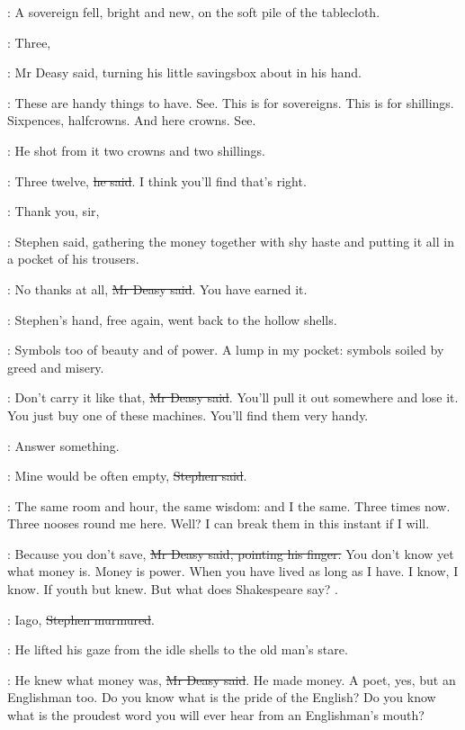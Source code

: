 :
A sovereign fell, bright and new, on the soft pile of the tablecloth.

\deasy:
Three,

:
Mr Deasy said, turning his little savingsbox about in his hand.

\deasy:
These are handy things to have.
See.
This is for sovereigns.
This is for shillings.
Sixpences, halfcrowns.
And here crowns.
See.

:
He shot from it two crowns and two shillings.

\deasy:
Three twelve, \sout{he said}. I think you'll find that's right.

\Stephen:
Thank you, sir,

:
Stephen said, gathering the money together with shy haste
and putting it all in a pocket of his trousers.

\deasy:
No thanks at all, \sout{Mr Deasy said}. You have earned it.

:
Stephen's hand, free again, went back to the hollow shells.

\StephenInt:
Symbols too of beauty and of power.
A lump in my pocket: symbols soiled by greed and misery.

\deasy:
Don't carry it like that,
\sout{Mr Deasy said}.
You'll pull it out somewhere and lose it.
You just buy one of these machines.
You'll find them very handy.

\StephenInt:
Answer something.

\Stephen:
Mine would be often empty,
\sout{Stephen said}.

\StephenInt:
The same room and hour, the same wisdom:
and I the same.
Three times now.
Three nooses round me here.
Well?
I can break them in this instant if I will.

\deasy:
Because you don't save,
\sout{Mr Deasy said, pointing his finger.}
You don't know yet what money is.
Money is power.
When you have lived as long as I have.
I know, I know.
If youth but knew.
But what does Shakespeare say?
.

\Stephen:
Iago,
\sout{Stephen murmured}.

:
He lifted his gaze from the idle shells to the old man's stare.

\deasy:
He knew what money was, \sout{Mr Deasy said}.
He made money.
A poet, yes, but an Englishman too.
Do you know what is the pride of the English?
Do you know what is the proudest word you will ever hear from an Englishman's mouth?

